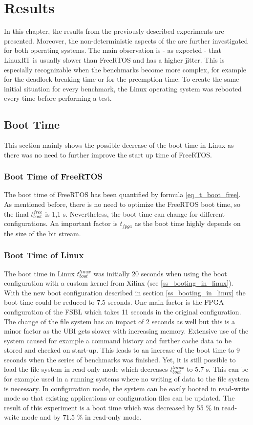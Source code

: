 \chapter{Results}\label{ch_results}
In this chapter, the results from the previously described experiments are presented.
Moreover, the non-deterministic aspects of the are further investigated for both operating systems. 
The main observation is - as expected - that LinuxRT is usually slower than FreeRTOS and has a higher jitter. 
This is especially recognizable when the benchmarks become more complex, for example for the deadlock breaking time or for the preemption time.
To create the same initial situation for every benchmark, the Linux operating system was rebooted every time before performing a test.

\section{Boot Time}
This section mainly shows the possible decrease of the boot time in Linux as there was no need to further improve the start up time of FreeRTOS.

\subsection{Boot Time of FreeRTOS}
The boot time of FreeRTOS has been quantified by formula \ref{eq_t_boot_free}.
As mentioned before, there is no need to optimize the FreeRTOS boot time, so the final $ t_{boot}^{free} $ is 1,1 s.
Nevertheless, the boot time can change for different configurations.
An important factor is $t_{fpga}$ as the boot time highly depends on the size of the bit stream.

\subsection{Boot Time of Linux}
The boot time in Linux $ t_{boot}^{linux} $ was initially 20 seconds when using the boot configuration with a custom kernel from Xilinx (see \ref{ss_booting_in_linux}). 
With the new boot configuration described in section \ref{ss_booting_in_linux} the boot time could be reduced to 7.5 seconds. 
One main factor is the \ac{FPGA} configuration of the \ac{FSBL} which takes 11 seconds in the original configuration.
The change of the file system has an impact of 2 seconds as well but this is a minor factor as the \ac{UBI} gets slower with increasing memory. 
Extensive use of the system caused for example a command history and further cache data to be stored and checked on start-up.
This leads to an increase of the boot time to 9 seconds when the series of benchmarks was finished.
Yet, it is still possible to load the file system in read-only mode which decreases $ t_{boot}^{linux} $ to 5.7 s.
This can be for example used in a running systems where no writing of data to the file system is necessary.
In configuration mode, the system can be easily booted in read-write mode so that existing applications or configuration files can be updated. 
The result of this experiment is a boot time which was decreased by 55 \% in read-write mode and by 71.5 \% in read-only mode.

